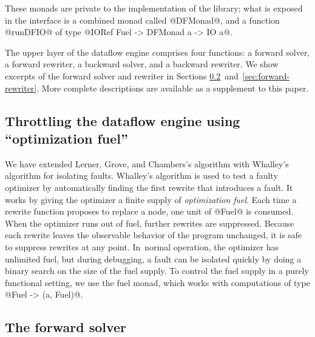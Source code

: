 \documentclass[blockstyle,preprint,nocopyrightspace]{sigplanconf}
\newcommand{\authornote}[1]{{\em #1}}
\def\authornote#1{\unskip\relax}
\newcommand{\norman}[1]{\authornote{NR: #1}}
\let\remark\norman
\newcommand\secreftwo[2]{Sections \ref{sec:#1}~and~\ref{sec:#2}}
\newcommand\seclabel[1]{\label{sec:#1}}
\begin{document}
These monads are private to the implementation of the library;
what is exposed in the interface is a combined monad called @DFMonad@, and a function
@runDFIO@ of type @IORef Fuel -> DFMonad a -> IO a@.
\remark{Unfortunately, this is the first mention of @Fuel@}

The upper layer of the dataflow engine comprises four functions:
a forward solver, a forward rewriter,
a backward solver, and a backward rewriter.
We show excerpts of the forward solver and rewriter in
\secreftwo{forward-solver}{forward-rewriter}. 
More complete descriptions are available as a supplement to this
paper. 



\subsection{Throttling the dataflow engine using ``optimization
  fuel''}

\seclabel{vpoiso}

We have extended Lerner, Grove, and Chambers's algorithm with
Whalley's \citeyearpar{whalley:isolation} algorithm for isolating
faults.
Whalley's algorithm is used to test a faulty optimizer by automatically
finding the first rewrite that introduces a fault.
It works by giving the optimizer a finite supply of \emph{optimization
fuel}.
Each time a rewrite function proposes to replace a node, one unit of @Fuel@ is
consumed.
When the optimizer runs out of fuel, further rewrites are suppressed.
Because each rewrite leaves the observable behavior of the
program unchanged, it is safe to suppress rewrites at
any point.
In~normal operation, the optimizer has unlimited fuel, but during
debugging, a fault can be isolated quickly by doing a binary search on
the size of the fuel supply.
To control the fuel supply in a purely functional setting, we use
the fuel monad, which works with
computations of type @Fuel -> (a, Fuel)@.


\subsection{The forward solver}

\seclabel{forward-solver}
\end{document}

